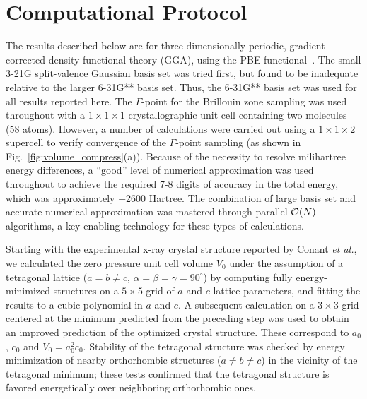 \documentclass[prb,aps,nobibnotes,twocolumn,doublespace,twocolumngrid,superbib]{revtex4}
\begin{document}
\section{Computational Protocol}
\label{sec:protocol}
The results described below are for three-dimensionally periodic,
gradient-corrected density-functional theory (GGA), using the PBE
functional~\cite{Perdew_96v77}. The small 3-21G split-valence Gaussian 
basis set was tried first, but found to be inadequate relative to the
larger 6-31G** basis set.  Thus, the 6-31G** basis set was used
for all results reported here. The $\Gamma$-point for the Brillouin zone sampling was 
used throughout with a $1 \times 1 \times 1 $ crystallographic unit 
cell containing two molecules (58 atoms).  However, a number of calculations 
were carried out using a $1 \times 1 \times 2 $ supercell to verify 
convergence of the $\Gamma$-point sampling (as shown in 
Fig.~\ref{fig:volume_compress}(a)).  
Because of the necessity to resolve milihartree energy differences,
a ``good'' level of numerical approximation was used throughout to
achieve the required 7-8 digits of accuracy in the total energy,
which was approximately $-$2600 Hartree.
The combination of large basis set and accurate numerical
approximation was mastered through parallel ${\cal O}(N)$ algorithms, a 
key enabling technology for these types of calculations. 

Starting with the experimental x-ray crystal structure reported by
Conant {\it et al.},~\cite{Conant_1979} we calculated the zero
pressure unit cell volume $V_0$ under the assumption of a tetragonal
lattice ($a=b\neq c$, $\alpha=\beta=\gamma=90^\circ$) by computing
fully energy-minimized structures on a $5\times 5$ grid of $a$ and $c$
lattice parameters, and fitting the results to a cubic polynomial in
$a$ and $c$.  A subsequent calculation on a $3 \times 3$ grid centered
at the minimum predicted from the preceding step was used to obtain an
improved prediction of the optimized crystal structure.  These
correspond to $a_0$, $c_0$ and $V_0=a_0^2c_0$.  Stability of the 
tetragonal structure was checked by energy minimization of nearby
orthorhombic structures ($a\neq b\neq c$) in the vicinity of the tetragonal 
minimum; these tests confirmed that the tetragonal structure is favored 
energetically over neighboring orthorhombic ones.
\end{document}
